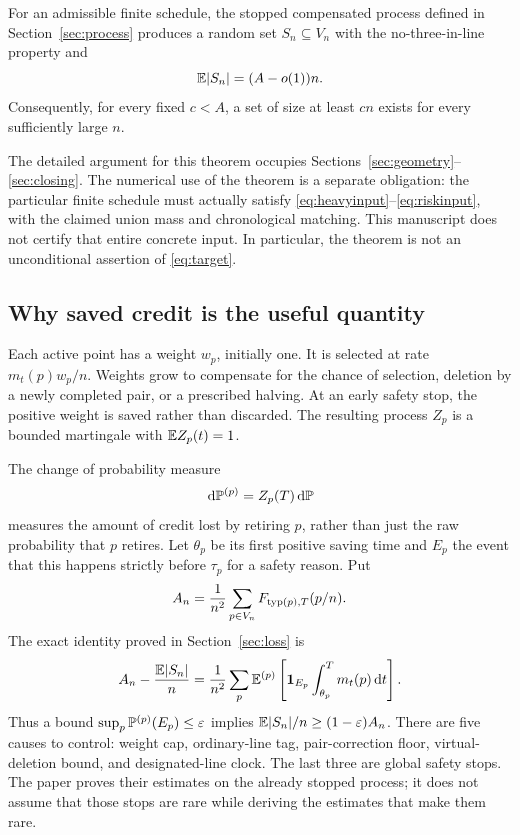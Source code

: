 \begin{theorem}\label{thm:bridge}
For an admissible finite schedule, the stopped compensated process
defined in Section~\ref{sec:process} produces a random set \(S_n\subseteq
V_n\) with the no-three-in-line property and
\[
 \mathbb E|S_n|=(A-o(1))n.
\]
Consequently, for every fixed \(c<A\), a set of size at least \(cn\)
exists for every sufficiently large \(n\).
\end{theorem}

The detailed argument for this theorem occupies
Sections~\ref{sec:geometry}--\ref{sec:closing}. The numerical use of the
theorem is a separate obligation: the particular finite schedule must
actually satisfy \eqref{eq:heavyinput}--\eqref{eq:riskinput}, with the
claimed union mass and chronological matching. This manuscript does
not certify that entire concrete input. In particular, the theorem
is not an unconditional assertion of \eqref{eq:target}.

\subsection{Why saved credit is the useful quantity}
Each active point has a weight \(w_p\), initially one. It is selected at
rate \(m_t(p)w_p/n\). Weights grow to compensate for the chance of
selection, deletion by a newly completed pair, or a prescribed
halving. At an early safety stop, the positive weight is saved rather
than discarded. The resulting process \(Z_p\) is a bounded martingale
with \(\mathbb E Z_p(t)=1\).

The change of probability measure
\[
 \,\mathrm d\mathbb P^{(p)}=Z_p(T)\,\mathrm d\mathbb P
\]
measures the amount of credit lost by retiring \(p\), rather than just
the raw probability that \(p\) retires. Let \(\theta_p\) be its first
positive saving time and \(E_p\) the event that this happens strictly
before \(\tau_p\) for a safety reason. Put
\[
 A_n=\frac1{n^2}\sum_{p\in V_n}F_{\operatorname{typ}(p),T}(p/n).
\]
The exact identity proved in Section~\ref{sec:loss} is
\begin{equation}\label{eq:previewloss}
 A_n-\frac{\mathbb E|S_n|}{n}
 =\frac1{n^2}\sum_p\mathbb E^{(p)}\left[
 \mathbf 1_{E_p}\int_{\theta_p}^{T}m_t(p)\,\mathrm d t\right].
\end{equation}
Thus a bound \(\sup_p\mathbb P^{(p)}(E_p)\le\varepsilon\) implies
\(\mathbb E|S_n|/n\ge(1-\varepsilon)A_n\).
There are five causes to control: weight cap, ordinary-line tag,
pair-correction floor, virtual-deletion bound, and designated-line clock.
The last three are global safety stops. The paper proves their estimates
on the already stopped process; it does not assume that those stops
are rare while deriving the estimates that make them rare.

